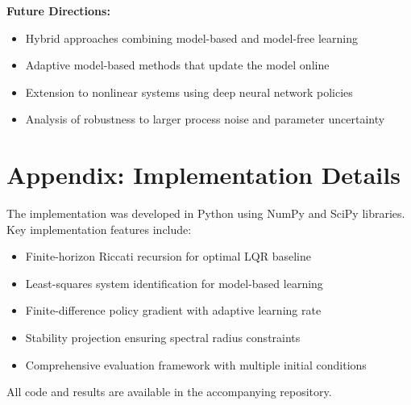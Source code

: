 \documentclass{report}
\begin{document}
\textbf{Future Directions:}
\begin{itemize}
    \item Hybrid approaches combining model-based and model-free learning
    \item Adaptive model-based methods that update the model online
    \item Extension to nonlinear systems using deep neural network policies
    \item Analysis of robustness to larger process noise and parameter uncertainty
\end{itemize}

\section*{Appendix: Implementation Details}

The implementation was developed in Python using NumPy and SciPy libraries. Key implementation features include:

\begin{itemize}
    \item Finite-horizon Riccati recursion for optimal LQR baseline
    \item Least-squares system identification for model-based learning
    \item Finite-difference policy gradient with adaptive learning rate
    \item Stability projection ensuring spectral radius constraints
    \item Comprehensive evaluation framework with multiple initial conditions
\end{itemize}

All code and results are available in the accompanying repository.
\end{document}
